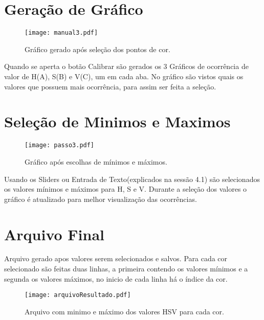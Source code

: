\section{Geração de Gráfico}
\begin{figure}[!h]
	\centering
	\texttt{[image: manual3.pdf]}
	\caption{Gráfico gerado após seleção dos pontos de cor.}
	\label{GraficoGerado}
\end{figure} 
Quando se aperta o botão Calibrar são gerados os 3 Gráficos de ocorrência de valor de H(A), S(B) e V(C), um em cada aba. No gráfico são vistos quais os valores que possuem mais ocorrência, para assim ser feita a seleção.
\newpage
\section{Seleção de Minimos e Maximos}
\begin{figure}[!h]
	\centering
	\texttt{[image: passo3.pdf]}
	\caption{Gráfico após escolhas de mínimos e máximos.}
	\label{GraficoGerado2}
\end{figure}
Usando os Sliders ou Entrada de Texto(explicados na sessão 4.1) são selecionados os valores mínimos e máximos para H, S e V. Durante a seleção dos valores o gráfico é atualizado para melhor visualização das ocorrências.
\section{Arquivo Final}

Arquivo gerado apos valores serem selecionados e salvos. Para cada cor selecionado são feitas duas linhas, a primeira contendo os valores mínimos e a segunda os valores máximos, no inicio de cada linha há o índice da cor.
  \begin{figure}[!h]
  	\centering
  	\texttt{[image: arquivoResultado.pdf]}
  	\caption{Arquivo com minimo e máximo dos valores HSV para cada cor.}
  	\label{ArquivoValores}
  \end{figure}
  \newpage
	
\newpage
